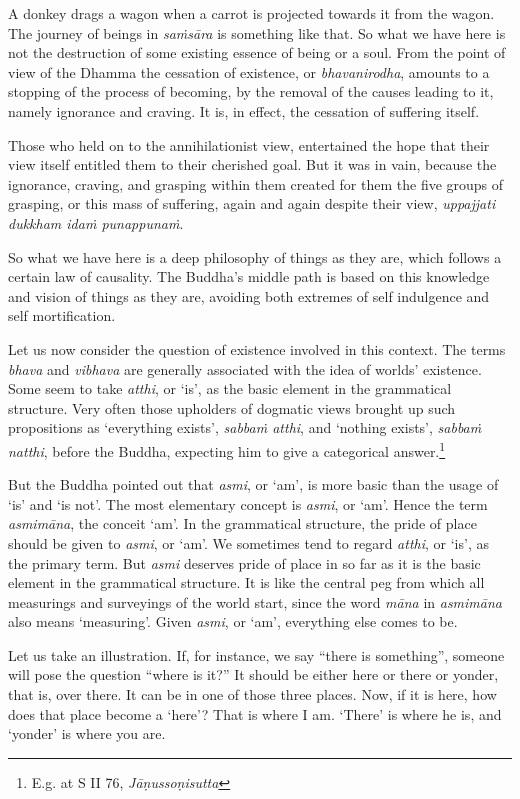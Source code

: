 A donkey drags a wagon when a carrot is projected towards it from the wagon. The journey of beings in \emph{saṁsāra} is something like that. So what we have here is not the destruction of some existing essence of being or a soul. From the point of view of the Dhamma the cessation of existence, or \emph{bhavanirodha}, amounts to a stopping of the process of becoming, by the removal of the causes leading to it, namely ignorance and craving. It is, in effect, the cessation of suffering itself.

Those who held on to the annihilationist view, entertained the hope that their view itself entitled them to their cherished goal. But it was in vain, because the ignorance, craving, and grasping within them created for them the five groups of grasping, or this mass of suffering, again and again despite their view, \emph{uppajjati dukkham idaṁ punappunaṁ}.

So what we have here is a deep philosophy of things as they are, which follows a certain law of causality. The Buddha's middle path is based on this knowledge and vision of things as they are, avoiding both extremes of self indulgence and self mortification.

Let us now consider the question of existence involved in this context. The terms \emph{bhava} and \emph{vibhava} are generally associated with the idea of worlds' existence. Some seem to take \emph{atthi}, or `is', as the basic element in the grammatical structure. Very often those upholders of dogmatic views brought up such propositions as `everything exists', \emph{sabbaṁ atthi}, and `nothing exists', \emph{sabbaṁ natthi}, before the Buddha, expecting him to give a categorical answer.\footnote{E.g. at S II 76, \emph{Jāṇussoṇisutta}}

But the Buddha pointed out that \emph{asmi}, or `am', is more basic than the usage of `is' and `is not'. The most elementary concept is \emph{asmi}, or `am'. Hence the term \emph{asmimāna}, the conceit `am'. In the grammatical structure, the pride of place should be given to \emph{asmi}, or `am'. We sometimes tend to regard \emph{atthi}, or `is', as the primary term. But \emph{asmi} deserves pride of place in so far as it is the basic element in the grammatical structure. It is like the central peg from which all measurings and surveyings of the world start, since the word \emph{māna} in \emph{asmimāna} also means `measuring'. Given \emph{asmi}, or `am', everything else comes to be.

Let us take an illustration. If, for instance, we say ``there is something'', someone will pose the question ``where is it?'' It should be either here or there or yonder, that is, over there. It can be in one of those three places. Now, if it is here, how does that place become a `here'? That is where I am. `There' is where he is, and `yonder' is where you are.

